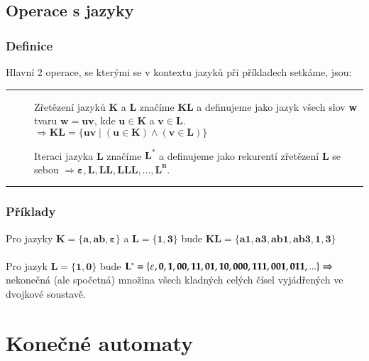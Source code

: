\documentclass{report}
\begin{document}
\section{Operace s jazyky}
\subsection*{Definice}
Hlavní 2 operace, se kterými se v kontextu jazyků při příkladech setkáme, jsou:
\vspace{0.4cm}    
\hrule
\vspace{0.1cm}
\begin{description}

   \item[] Zřetězení jazyků \textbf{K} a \textbf{L} značíme \textbf{KL} a definujeme jako jazyk všech slov \textbf{w} tvaru $\mathbf{w = uv}$, kde $\mathbf{u \in K}$ a $\mathbf{v \in L}$. \\$\Rightarrow \mathbf{KL = \{ uv \mid (u\in K)\land(v\in L) \}}$
   \item[] Iteraci jazyka \textbf{L} značíme $\mathbf{L^*}$ a definujeme jako rekurentí zřetězení \textbf{L} se sebou $\Rightarrow \mathbf{\varepsilon,L,LL,LLL,...,L^n}$.

\end{description}
\vspace{0.1cm}    
\hrule
\vspace{0.4cm} 

\subsection*{Příklady}

Pro jazyky $\mathbf{K=\{a,ab,\varepsilon\}}$ a $\mathbf{L=\{1,3}\}$ bude $\mathbf{KL=\{a1,a3,ab1,ab3,1,3\}}$
\\ \\
Pro jazyk $\mathbf{L = \{1,0\}}$ bude $\mathbf{L^* = \{\varepsilon, 0,1,00,11,01,10,000,111,001,011,...\}}
\\ \Rightarrow$ nekonečná (ale spočetná) množina všech kladných celých čísel vyjádřených ve dvojkové soustavě.
\setcounter{chapter}{2}
\setcounter{section}{0}
\chapter*{Konečné automaty}
\end{document}
